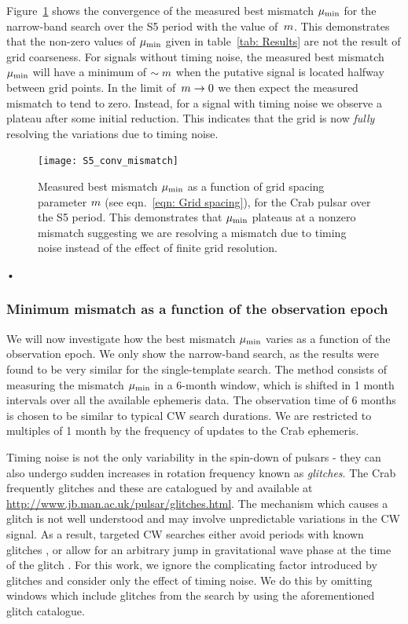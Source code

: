 \documentclass[../full_thesis/full_thesis.tex]{subfiles}
\begin{document}
Figure~\ref{fig: conv} shows the convergence of the measured best mismatch
$\mu_{\mathrm{min}}$ for the narrow-band search over the S5 period with the value
of~$m$.  This demonstrates that the non-zero values of $\mu_{\mathrm{min}}$ given in
table~\ref{tab: Results} are not the result of grid coarseness.  For signals
without timing noise, the measured best mismatch $\mu_{\mathrm{min}}$ will have a minimum
of $\sim m$ when the putative signal is located halfway between grid
points. In the limit of~$m \rightarrow 0$ we then expect the measured
mismatch to tend to zero. Instead, for a signal with timing noise we observe a
plateau after some initial reduction. This indicates that the grid is now
\emph{fully} resolving the variations due to timing noise.
\begin{figure}[htb]
\centering
\texttt{[image: S5\_conv\_mismatch]}
\caption{Measured best mismatch $\mu_{\mathrm{min}}$ as a function
of grid spacing parameter $m$ (see eqn.~\eqref{eqn: Grid spacing}), for the Crab pulsar over the S5 period.
    This demonstrates that $\mu_{\mathrm{min}}$ plateaus at a nonzero mismatch suggesting
    we are resolving a mismatch due to timing noise instead of the effect of finite
    grid resolution.}
\label{fig: conv}
\end{figure}•





\subsubsection{Minimum mismatch as a function of the observation epoch}
\label{sec: Minimum mismatch as a function of the observation epoch}

We will now investigate how the best mismatch $\mu_{\mathrm{min}}$ varies as a function of
the observation epoch. We only show the narrow-band search, as the results were
found to be very similar for the single-template search. The method consists of
measuring the mismatch $\mu_{\mathrm{min}}$ in a 6-month window, which is shifted in 1
month intervals over all the available ephemeris data. The observation time of
6 months is chosen to be similar to typical CW search durations. We are
restricted to multiples of 1 month by the frequency of updates to the Crab
ephemeris.

Timing noise is not the only variability in the spin-down of pulsars - they can
also undergo sudden increases in rotation frequency known as \emph{glitches}.
The Crab frequently glitches and these are catalogued by \citet{Espinoza2011}
and available at \url{http://www.jb.man.ac.uk/pulsar/glitches.html}.
The mechanism which causes a glitch is not well understood and may involve
unpredictable variations in the CW signal. As a result, targeted CW searches
either avoid periods with known glitches \citep{LIGO2008}, or 
allow for an arbitrary jump in gravitational wave phase at the time of
the glitch \citep{LIGO2010}. For this work, we ignore
the complicating factor introduced by glitches and consider 
only the effect of timing noise. We do this by
omitting windows which include glitches from the search by using
the aforementioned glitch catalogue.
\end{document}

